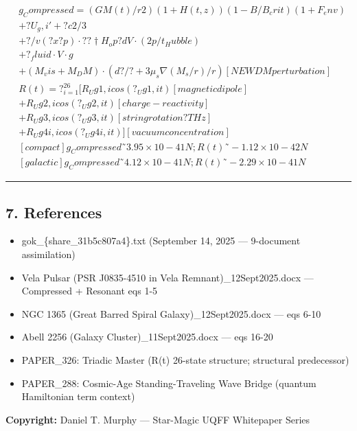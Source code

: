 \[
\begin{aligned}
  & g_Compressed = (GM(t)/r2)(1+H(t,z))(1-B/B_crit)(1+F_env) \\
  & + ?U_g,i' + ?c2/3 \\
  & + ?/v(?x?p)\cdot??†H_op ? dV\cdot(2p/t_Hubble) \\
  & + ?_fluid\cdot V\cdot g \\
  & + (M_vis+M_DM)\cdot(d?/? + 3\mu_s\nabla(M_s/r)/r)     [NEW DM perturbation] \\
  & R(t) = ?_{i=1}^{26} [R_Ug1,i cos(?_Ug1,i t)       [magnetic dipole] \\
  & + R_Ug2,i cos(?_Ug2,i t)       [charge-reactivity] \\
  & + R_Ug3,i cos(?_Ug3,i t)       [string rotation ? THz] \\
  & + R_Ug4i,i cos(?_Ug4i,i t)]    [vacuum concentration] \\
  & [compact]  g_Compressed ˜ 3.95\times10-41 N; R(t) ˜ -1.12\times10-42 N \\
  & [galactic] g_Compressed ˜ 4.12\times10-41 N; R(t) ˜ -2.29\times10-41 N
\end{aligned}
\]

\begin{center}\rule{0.5\linewidth}{0.5pt}\end{center}

\subsection{7. References}\label{references}

\begin{itemize}
\tightlist
\item
  gok\_\{share\_31b5c807a4\}.txt (September 14, 2025 --- 9-document
  assimilation)
\item
  Vela Pulsar (PSR J0835-4510 in Vela Remnant)\_12Sept2025.docx ---
  Compressed + Resonant eqs 1-5
\item
  NGC 1365 (Great Barred Spiral Galaxy)\_12Sept2025.docx --- eqs 6-10
\item
  Abell 2256 (Galaxy Cluster)\_11Sept2025.docx --- eqs 16-20
\item
  PAPER\_326: Triadic Master (R(t) 26-state structure; structural
  predecessor)
\item
  PAPER\_288: Cosmic-Age Standing-Traveling Wave Bridge (quantum
  Hamiltonian term context)
\end{itemize}

\textbf{Copyright:} Daniel T. Murphy --- Star-Magic UQFF Whitepaper
Series

